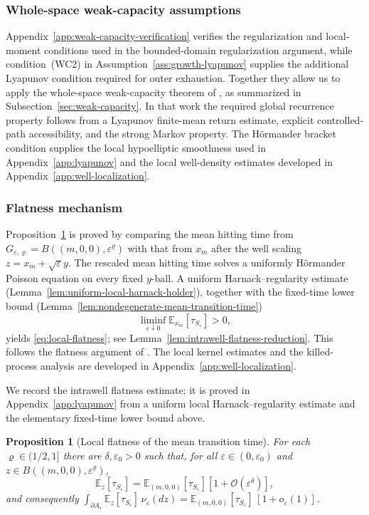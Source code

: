 \documentclass[11pt]{article}
\numberwithin{equation}{section}
\theoremstyle{plain}
\newtheorem{proposition}[theorem]{Proposition}
\theoremstyle{definition}
\theoremstyle{remark}
\newcommand{\eps}{\varepsilon}
\newcommand{\E}{\mathbb E}
\begin{document}
\subsubsection*{Whole-space weak-capacity assumptions}
Appendix~\ref{app:weak-capacity-verification} verifies the regularization and
local-moment conditions used in the bounded-domain regularization argument, while
condition~\textup{(WC2)} in
Assumption~\ref{ass:growth-lyapunov} supplies the additional Lyapunov condition
required for outer exhaustion.  Together they
allow us to apply the whole-space weak-capacity theorem of
\cite{HeLiWangZhu2026WeakEquilibrium}, as summarized in
Subsection~\ref{sec:weak-capacity}.  In that work the required global
recurrence property follows from a Lyapunov finite-mean return estimate,
explicit controlled-path accessibility, and the strong Markov property.  The
H\"ormander bracket condition supplies the local hypoelliptic smoothness used
in Appendix~\ref{app:lyapunov} and the local well-density estimates developed
in Appendix~\ref{app:well-localization}.

\subsubsection*{Flatness mechanism}
Proposition~\ref{prop:local-flatness} is proved by comparing the mean hitting
time from $G_{\eps,\varrho}=B((m,0,0),\eps^\varrho)$ with that from $x_m$ after the
well scaling $z=x_m+\sqrt\eps y$.  The rescaled mean hitting time solves a
uniformly H\"ormander Poisson equation on every fixed $y$-ball.  A uniform
Harnack--regularity estimate
(Lemma~\ref{lem:uniform-local-harnack-holder}), together with the fixed-time
lower bound (Lemma~\ref{lem:nondegenerate-mean-transition-time})
\[
\liminf_{\eps\downarrow0}\E_{x_m}[\tau_{S_\eps}]>0,
\]
yields
\eqref{eq:local-flatness}; see
Lemma~\ref{lem:intrawell-flatness-reduction}.  This follows the flatness
argument of \cite[Proposition~2.10 and Section~6]{LeeRamilSeo2026}.
The local kernel estimates and the killed-process analysis are developed
in Appendix~\ref{app:well-localization}.

We record the intrawell flatness estimate; it is proved in
Appendix~\ref{app:lyapunov} from a uniform local Harnack--regularity estimate
and the elementary fixed-time lower bound above.

\begin{proposition}[Local flatness of the mean transition time]
\label{prop:local-flatness}
For each $\varrho\in(1/2,1]$ there are $\delta,\eps_0>0$ such that, for all
$\eps\in(0,\eps_0)$ and $z\in B((m,0,0),\eps^\varrho)$,
\begin{equation}
\label{eq:local-flatness}
\E_z[\tau_{S_\eps}]
=
\E_{(m,0,0)}[\tau_{S_\eps}]\left[1+\mathcal O(\eps^\delta)\right],
\end{equation}
and consequently
$\int_{\partial A_\eps}\E_z[\tau_{S_\eps}]\,\nu_\eps(dz)
=\E_{(m,0,0)}[\tau_{S_\eps}]\,[1+o_\eps(1)]$.
\end{proposition}
\end{document}

